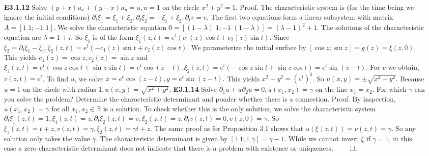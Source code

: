 \documentclass[6pt]{article}
\newcommand{\R}{\mathbb{R}}
\begin{document}
\begin{multicols}{2}
{\bf E3.1.12} Solve $(y+x)u_x+(y-x)u_y=u, u=1$ on the circle $x^2+y^2=1$.  Proof. The characteristic system is (for the time being we ignore the initial conditions) $\partial_t\xi_1=\xi_1+\xi_2, \partial_t\xi_2=-\xi_1+\xi_2, \partial_t v=v$. The first two equations form a linear subsystem with matrix $A=[1 \;1;-1\; 1]$. We solve the characteristic equation $0=[(1-\lambda) \;1;-1\; (1-\lambda)]=(\lambda-1)^2 +1$. The solutions of the characteristic equation are $\lambda = 1 \pm i$. So $\xi_1$ is of the form $\xi_1(z,t)=e^t(c_1(z)\cos t+c_2(z) \sin t)$. Since $\xi_2=\partial_t \xi_1-\xi_1, \xi_2(z,t)=e^t(-c_1(z)\sin t+c_2(z) \cos t)$. We parameterize the initial surface by $[\cos z ; \sin z]=g(z)=\xi(z,0)$. This yields $c_1(z)=\cos z, c_2(z) = \sin z$ and $\xi_1(z,t)=e^t(\cos z \cos t + \sin z \sin t)=e^t \cos(z-t), \xi_2(z,t)=e^t(- \cos z \sin t+\sin z \cos t) = e^t \sin(z-t)$. For $v$ we obtain, $v(z,t)=e^t$. To find $u$, we solve $x = e^t \cos(z-t), y =  e^t \sin(z-t).$ This yields $x^2 + y^2 = (e^t)^2$. So $u(x,y)= \pm \sqrt{x^2+y^2}.$ Because $u=1$ on the circle with radius $1, u(x,y)= \sqrt{x^2+y^2}.$
{\bf E3.1.14} Solve $\partial_1u+u\partial_2u=0, u(x_1,x_2)=\gamma$ on the line $x_1=x_2$. For which $\gamma$ can you solve the problem?  Determine the characteristic determinant and ponder whether there is a connection. Proof.  By inspection, $u(x_1,x_2)=\gamma$ for all $x_1, x_2 \in \R$ is a solution.  To check whether this is the only solution, we solve the characteristic system $\partial_t\xi_1(z,t)=1, \xi_1(z,t)=z, \partial_t\xi_2(z,t)=v, \xi_2(z,t)=z, \partial_tv(z,t)=0, v(z,0)=\gamma$. So $\xi_1(z,t)=t+z, v(z,t)=\gamma, \xi_2(z,t)=\gamma t+z$. The same proof as for Proposition 3.1 shows that $u(\xi(z,t))=v(z,t)=\gamma$. So any solution only takes the value $\gamma$. The characteristic determinant is given by $[1 \; 1; 1 \; \gamma] = \gamma-1$. While we cannot invert $\xi$ if $\gamma=1$, in this case a zero characteristic determinant does not indicate that there is a problem with existence or uniqueness. $\qed$.

\end{multicols}
\end{document}
